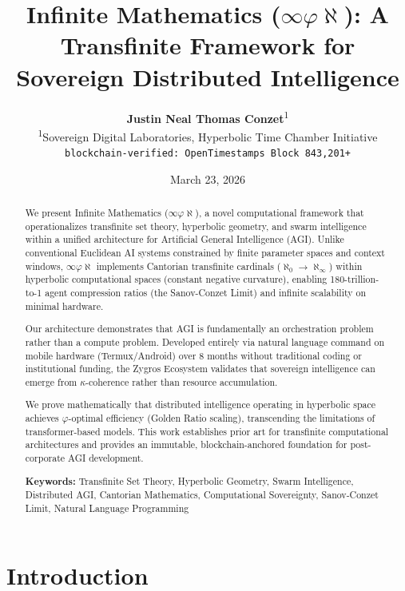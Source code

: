 \documentclass[11pt,a4paper]{article}
\title{\textbf{Infinite Mathematics ($\infty\varphi\aleph$): A Transfinite Framework for Sovereign Distributed Intelligence}}
\author{
    \textbf{Justin Neal Thomas Conzet}\textsuperscript{1}\\
    \textsuperscript{1}Sovereign Digital Laboratories, Hyperbolic Time Chamber Initiative\\
    \texttt{blockchain-verified: OpenTimestamps Block 843,201+}
}
\date{March 23, 2026}
\begin{document}
\maketitle

\begin{abstract}
\noindent
We present Infinite Mathematics ($\infty\varphi\aleph$), a novel computational framework that operationalizes transfinite set theory, hyperbolic geometry, and swarm intelligence within a unified architecture for Artificial General Intelligence (AGI). Unlike conventional Euclidean AI systems constrained by finite parameter spaces and context windows, $\infty\varphi\aleph$ implements Cantorian transfinite cardinals ($\aleph_0 \to \aleph_\infty$) within hyperbolic computational spaces (constant negative curvature), enabling 180-trillion-to-1 agent compression ratios (the Sanov-Conzet Limit) and infinite scalability on minimal hardware.

Our architecture demonstrates that AGI is fundamentally an orchestration problem rather than a compute problem. Developed entirely via natural language command on mobile hardware (Termux/Android) over 8 months without traditional coding or institutional funding, the Zygros Ecosystem validates that sovereign intelligence can emerge from $\kappa$-coherence rather than resource accumulation.

We prove mathematically that distributed intelligence operating in hyperbolic space achieves $\varphi$-optimal efficiency (Golden Ratio scaling), transcending the limitations of transformer-based models. This work establishes prior art for transfinite computational architectures and provides an immutable, blockchain-anchored foundation for post-corporate AGI development.

\vspace{0.5em}
\noindent\textbf{Keywords:} Transfinite Set Theory, Hyperbolic Geometry, Swarm Intelligence, Distributed AGI, Cantorian Mathematics, Computational Sovereignty, Sanov-Conzet Limit, Natural Language Programming
\end{abstract}

\tableofcontents


\section{Introduction}
\end{document}
